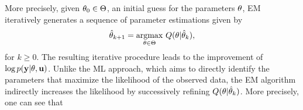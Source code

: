 More precisely, given ${ \mathrm{\theta} }_0\in\Theta$, an initial guess for the parameters ${ \mathrm{\theta} }$, EM iteratively generates a sequence of parameter estimations given by
\begin{equation}\label{eq:EM optimization}
    \hat{\vctheta}_{k+1}
    =
    \argmaxOp_{\vctheta\in\Theta}\,
    Q(\vctheta|\hat{\vctheta}_k),
\end{equation}
for $k\ge 0$.
The resulting iterative procedure leads to the improvement of $\log p(\mathbf{y}|{ \mathrm{\theta} },\mathbf{u})$. Unlike the ML approach, which aims to directly identify the parameters that maximize the likelihood of the observed data, the EM algorithm indirectly increases the likelihood by successively refining $Q({ \mathrm{\theta} }|\hat{{ \mathrm{\theta} }}_k)$.
%
More precisely, one can see that
